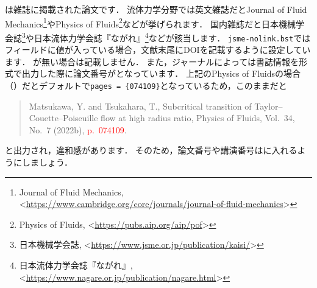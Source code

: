 \documentclass[a4paper,fleqn,uplatex,dvipdfmx]{jsarticle}
\newcommand{\jsmefile}{\texttt{jsme-nolink.bst}}
\begin{document}
\ttarticle は雑誌に掲載された論文です．
流体力学分野では英文雑誌だとJournal of Fluid Mechanics\footnote{Journal of Fluid Mechanics, \textless\url{https://www.cambridge.org/core/journals/journal-of-fluid-mechanics}\textgreater}やPhysics of Fluids\footnote{Physics of Fluids, \textless\url{https://pubs.aip.org/aip/pof}\textgreater}などが挙げられます．
国内雑誌だと日本機械学会誌\footnote{日本機械学会誌, \textless\url{https://www.jsme.or.jp/publication/kaisi/}\textgreater}や日本流体力学会誌『ながれ』\footnote{日本流体力学会誌『ながれ』, \textless\url{https://www.nagare.or.jp/publication/nagare.html}\textgreater}などが該当します．
\jsmefile では\ttdoi フィールドに値が入っている場合，文献末尾にDOIを記載するように設定しています．
\ttdoi が無い場合は記載しません．
また，ジャーナルによっては書誌情報を\BibTeX{}形式で出力した際に論文番号が\ttpages となっています．
上記のPhysics of Fluidsの場合（\citealp{Matsukawa:PoF2022}）だとデフォルトで\verb|pages = {074109}|となっているため，このままだと
\begin{quote}
    Matsukawa, Y. and Tsukahara, T., Subcritical transition of Taylor--Couette--Poiseuille flow at high radius ratio, Physics of Fluids, Vol.~34, No.~7 (2022b), \textcolor{red}{p.~074109}.
\end{quote}
と出力され，違和感があります．
そのため，論文番号や講演番号は\ttnote に入れるようにしましょう．
\end{document}

